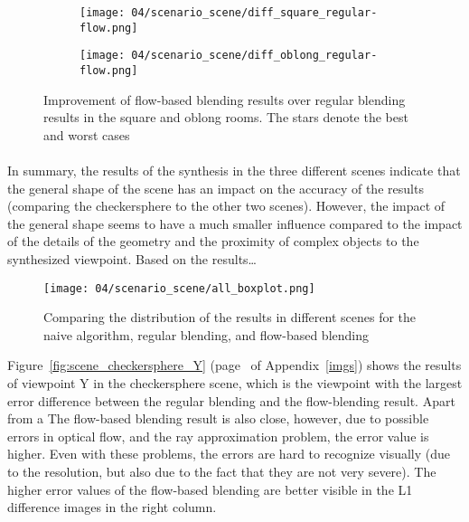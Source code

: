 \begin{figure}
\centering
    \hfill
    \begin{subfigure}[b]{0.45\textwidth}
            \centering
            \texttt{[image: 04/scenario\_scene/diff\_square\_regular-flow.png]}
            \caption{}
    \end{subfigure}
    \hfill
    \begin{subfigure}[b]{0.45\textwidth}
            \centering
            \texttt{[image: 04/scenario\_scene/diff\_oblong\_regular-flow.png]}
            \caption{}
    \end{subfigure}
    \hfill
  \caption[Improvement of flow-based blending results over regular blending results in the square and oblong rooms]{Improvement of flow-based blending results over regular blending results in the square and oblong rooms. The stars denote the best and worst cases} \label{fig:scene_diff_square_oblong}
\end{figure}


\paragraph{}
In summary, the results of the synthesis in the three different scenes indicate that the general shape of the scene has an impact on the accuracy of the results (comparing the checkersphere to the other two scenes). However, the impact of the general shape seems to have a much smaller influence compared to the impact of the details of the geometry and the proximity of complex objects to the synthesized viewpoint. Based on the results\ldots



\begin{figure}
		\centering
		\texttt{[image: 04/scenario\_scene/all\_boxplot.png]}
		\caption[The distribution of results in different scenes]{Comparing the distribution of the results in different scenes for the naive algorithm, regular blending, and flow-based blending}
		\label{fig:scenario_scene_boxplot}
\end{figure}


Figure~\ref{fig:scene_checkersphere_Y} (page~\pageref{fig:scene_checkersphere_Y} of Appendix~\ref{imgs}) shows the results of viewpoint Y in the checkersphere scene, which is the viewpoint with the largest error difference between the regular blending and the flow-blending result. Apart from a  The flow-based blending result is also close, however, due to possible errors in optical flow, and the ray approximation problem, the error value is higher. Even with these problems, the errors are hard to recognize visually (due to the resolution, but also due to the fact that they are not very severe). The higher error values of the flow-based blending are better visible in the L1 difference images in the right column.


